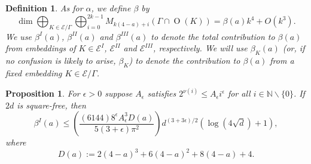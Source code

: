 \documentclass[12pt, a4paper]{article}
\newtheorem{proposition}[thm]{Proposition}
\newtheorem{defn}[thm]{Definition}
\newcommand{\NN}{\mathbb{N}}
\newcommand{\ec}{\mathcal{E}}
\newcommand{\opn}{\operatorname}
\begin{document}
\begin{defn}
  As for $\alpha$, we define $\beta$ by
\[
  \opn{dim} \bigoplus_{K \in \ec/ \Gamma} \bigoplus_{i=0}^{2k-1} M_{k(4-a) + i}(\Gamma \cap  \opn{O}(K))
  = \beta(a) k^4 + O(k^3).
  \]
We use
  $\beta^I(a)$,
  $\beta^{II}(a)$
  and
  $\beta^{III}(a)$
  to denote the total contribution to $\beta(a)$ from embeddings of
  $K \in \ec^I$,
  $\ec^{II}$ and
  $\ec^{III}$, respectively.
  We will use 
  $\beta_K(a)$
  (or, if no confusion is likely to arise, $\beta_K$)
  to denote the contribution to $\beta(a)$ from a fixed embedding
  $K \in \ec/\Gamma$.
\end{defn}
\begin{proposition}\label{betaIbound}
  For $\epsilon >0$ suppose $A_{\epsilon}$ satisfies $2^{\nu(i)} \leq A_{\epsilon} i^{\epsilon}$ for all $i \in \NN \backslash \{0\}$.
  If $2d$ is square-free, then    
\[
  \beta^I(a) \leq
  \left( \frac{(6144)  8^{\epsilon} A_{\epsilon}^3 D(a)}{5(3 + \epsilon) \pi^2} \right )d^{(3+ 3 \epsilon)/2} \left ( \opn{log}(4 \sqrt{d}) + 1 \right ),
\]
  where  
  \begin{equation}\label{Ddef}
    D(a) :=
    2(4-a)^3 +
    6(4-a)^2 +
    8(4-a) +
    4.
  \end{equation}
\end{proposition}
\end{document}
